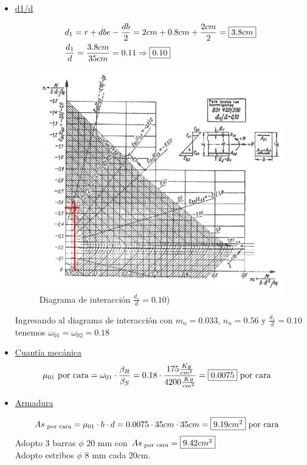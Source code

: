 \begin{enumerate}
\begin{itemize}
\item \underline{d1/d}

\begin{align*}
& d_1 = r + dbe - \frac{db}{2} = 2cm + 0.8cm + \frac{2cm}{2} =  \framebox{$3.8cm$}\\
& \frac{d_1}{d} = \frac{3.8cm}{35cm} = 0.11 \Rightarrow \framebox{0.10}
\end{align*}

\begin{figure}[H]
\begin{center}
	 \includegraphics[scale = 0.9]{chapters/chapter_1/images/figura3.png}
     \caption{Diagrama de interacción $\frac{d_1}{d} = 0.10$)}
\end{center}
\end{figure}
Ingresando al diagrama de interacción con $m_{n}=0.033$, $n_{n}=0.56$ y $\frac{d_1}{d} = 0.10$ tenemos $\omega_{01} = \omega_{02} = 0.18$

\item \underline{Cuantía mecánica}
\begin{align*}
& \mu_{01} \text{ por cara} = \omega_{01} \cdot \frac{\beta_R}{\beta_S} = 0.18 \cdot \frac{175 \frac{Kg}{cm^2}}{4200 \frac{Kg}{cm^2}} = \framebox{0.0075} \text{ por cara}
\end{align*}

\item \underline{Armadura}

\begin{align*}
& As_{\text{ por cara}} = \mu_{01} \cdot b \cdot d = 0.0075 \cdot 35cm \cdot 35cm = \framebox{$9.19cm^2$} \text{ por cara}
\end{align*}
Adopto 3 barras $\phi$ 20 mm con $As_{\text{ por cara}}=\framebox{$9.42cm^2$}$\\
Adopto estribos $\phi$ 8 mm cada 20cm.\\


\end{itemize}
\end{enumerate}
